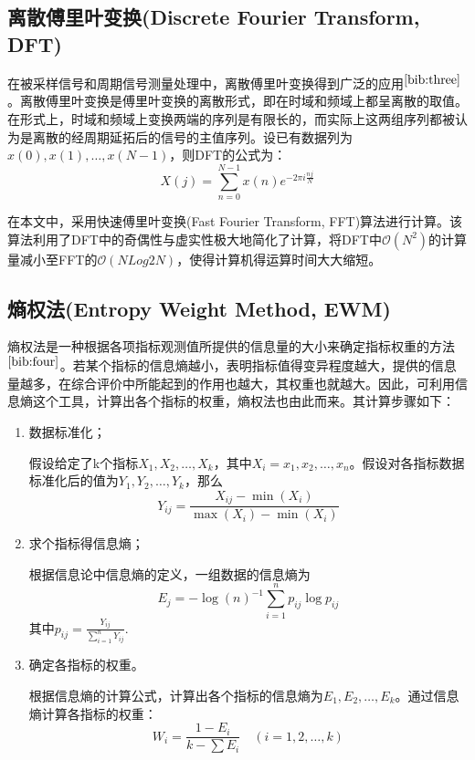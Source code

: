 \documentclass[bwprint]{cumcmthesis}
\begin{document}
        \subsection{离散傅里叶变换(Discrete Fourier Transform, DFT)}
        在被采样信号和周期信号测量处理中，离散傅里叶变换得到广泛的应用$^{\cite{bib:three}}$。离散傅里叶变换是傅里叶变换的离散形式，即在时域和频域上都呈离散的取值。在形式上，时域和频域上变换两端的序列是有限长的，而实际上这两组序列都被认为是离散的经周期延拓后的信号的主值序列。设已有数据列为$x(0),x(1),\dots,x(N-1)$，则DFT的公式为：
        \begin{equation}
            \label{eq:DFT}
            X(j) = \sum_{n=0}^{N-1}x(n)e^{-2\pi i\frac{nj}{N}}
        \end{equation}
        
        在本文中，采用快速傅里叶变换(Fast Fourier Transform, FFT)算法进行计算。该算法利用了DFT中的奇偶性与虚实性极大地简化了计算，将DFT中$\mathcal{O}(N^2)$的计算量减小至FFT的$\mathcal{O}(NLog2N)$，使得计算机得运算时间大大缩短。

        \subsection{熵权法(Entropy Weight Method, EWM)}
        熵权法是一种根据各项指标观测值所提供的信息量的大小来确定指标权重的方法$^{\cite{bib:four}}$。若某个指标的信息熵越小，表明指标值得变异程度越大，提供的信息量越多，在综合评价中所能起到的作用也越大，其权重也就越大。因此，可利用信息熵这个工具，计算出各个指标的权重，熵权法也由此而来。其计算步骤如下：
        \begin{enumerate}
            \item 数据标准化；
            
            假设给定了k个指标$X_1,X_2,\dots,X_k$，其中$X_i = {x_1,x_2,\dots,x_n}$。假设对各指标数据标准化后的值为$Y_1,Y_2,\dots,Y_k$，那么
            \begin{equation}
                \label{eq:EWM1}
                Y_{ij} = \frac{X_{ij}-\min(X_i)}{\max(X_i)-\min(X_i)}
            \end{equation}

            \item 求个指标得信息熵；
            
            根据信息论中信息熵的定义，一组数据的信息熵为
            \begin{equation}
                \label{eq:EWM2}
                E_j = -\log(n)^{-1}\sum_{i=1}^{n}p_{ij}\log p_{ij}
            \end{equation}
            其中$p_{ij} = \frac{Y_{ij}}{\sum_{i=1}^{n}Y_{ij}}$.
            \item 确定各指标的权重。
            
            根据信息熵的计算公式，计算出各个指标的信息熵为$E_1,E_2,\dots,E_k$。通过信息熵计算各指标的权重：
            \begin{equation}
                \label{eq:EWM3}
                W_i = \frac{1-E_i}{k-\sum E_i}\quad (i = 1,2,\dots,k)
            \end{equation}
        \end{enumerate}
        
\end{document}
